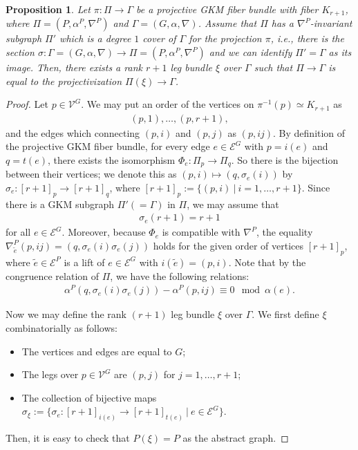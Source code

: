 \documentclass[12pt]{amsart}
\newtheorem{proposition}[theorem]{Proposition}
\theoremstyle{definition}
\theoremstyle{remark}
\numberwithin{equation}{section}
\begin{document}
\begin{proposition}
\label{realization}
Let $\pi:\Pi\to \Gamma$ be a projective GKM fiber bundle with fiber $K_{r+1}$, where
$\Pi=(P,\alpha^{P},\nabla^{P})$ and $\Gamma=(G,\alpha,\nabla)$.
Assume that $\Pi$ has a $\nabla^{P}$-invariant subgraph $\Pi'$ which is a degree $1$ cover of $\Gamma$ for the projection $\pi$, i.e.,
there is the section $\sigma:\Gamma=(G,\alpha,\nabla)\to \Pi=(P,\alpha^{P},\nabla^{P})$ and we can identify $\Pi'=\Gamma$ as its image.
Then, there exists a rank $r+1$ leg bundle $\xi$ over $\Gamma$ such that $\Pi\to \Gamma$ is equal to the projectivization $\Pi(\xi)\to\Gamma$.
\end{proposition}
\begin{proof}
Let $p\in \mathcal{V}^{G}$. We may put an order of the vertices on $\pi^{-1}(p)\simeq K_{r+1}$ as
\begin{align*}
(p,1),\ldots, (p,r+1),
\end{align*}
and the edges which connecting $(p,i)$ and $(p,j)$ as $(p,ij)$. By definition of the projective GKM fiber bundle, for every edge $e\in \mathcal{E}^{G}$ with $p=i(e)$ and $q=t(e)$, there exists the isomorphism $\Phi_{e}:\Pi_{p}\to \Pi_{q}$.
So there is the bijection between their vertices; we denote this as $(p,i)\mapsto (q,\sigma_{e}(i))$ by $\sigma_{e}:[r+1]_{p}\to [r+1]_{q}$, where $[r+1]_{p}:=\{(p,i)\ |\ i=1,\ldots, r+1\}$.
Since there is a GKM subgraph $\Pi'(=\Gamma)$ in $\Pi$, we may assume that
\begin{align*}
\sigma_{e}(r+1)=r+1
\end{align*}
for all $e\in \mathcal{E}^{G}$.
Moreover, because $\Phi_{e}$ is compatible with $\nabla^{P}$, the equality $\nabla^{P}_{\widetilde{e}}(p,ij)=(q,\sigma_{e}(i)\sigma_{e}(j))$ holds for the given order of vertices $[r+1]_{p}$, where $\widetilde{e}\in \mathcal{E}^{P}$ is a lift of $e\in \mathcal{E}^{G}$ with $i(\widetilde{e})=(p,i)$.
Note that by the congruence relation of $\Pi$, we have the following relations:
\begin{align}
\label{sect6:cong}
\alpha^{P}(q,\sigma_{e}(i)\sigma_{e}(j))-\alpha^{P}(p,ij)\equiv 0\mod \alpha(e).
\end{align}

Now we may define the rank $(r+1)$ leg bundle $\xi$ over $\Gamma$. We first define $\xi$ combinatorially as follows:
\begin{itemize}
\item The vertices and edges are equal to $G$;
\item The legs over $p\in \mathcal{V}^{G}$ are $(p,j)$ for $j=1,\ldots, r+1$;
\item The collection of bijective maps $\sigma_{\xi}:=\{\sigma_{e}:[r+1]_{i(e)}\to [r+1]_{t(e)}\ |\ e\in \mathcal{E}^{G}\}$.
\end{itemize}
Then, it is easy to check that $P(\xi)=P$ as the abstract graph.


\end{proof}
\end{document}

